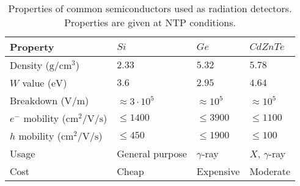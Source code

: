 \begin{table}[!ht]
	\centering
	\caption[Properties of common semiconductors used as radiation detectors.]{Properties of common semiconductors \cite{NSM2005,Eisen1996} used as radiation detectors. Properties are given at NTP conditions.}
	\label{chap3:semiconductor}
	\begin{tabularx}{\linewidth}{lXXX}
    \toprule
    Property & $Si$ & $Ge$ & $CdZnTe$ \\
    \midrule
    Density ($\mathrm{g/cm^3}$)& $2.33$  & $5.32$ & $5.78$ \\
    $W$ value ($\mathrm{eV}$) & $3.6$ & $2.95$ & $4.64$ \\
    Breakdown ($\mathrm{V/m}$) & $\approx 3\cdot10^5$ & $\approx 10^5$ & $\approx 10^5$\\
    $e^{-}$ mobility ($\mathrm{cm^{2}/V/s}$) & $\leq 1400$ & $\leq 3900$ & $\leq 1100$\\
    $h$ mobility ($\mathrm{cm^{2}/V/s}$) & $\leq 450$ & $\leq 1900$ & $\leq 100$ \\
    Usage & General purpose & $\gamma$-ray & $X$, $\gamma$-ray\\
    Cost & Cheap & Expensive & Moderate\\
		\bottomrule
	\end{tabularx}
\end{table}
